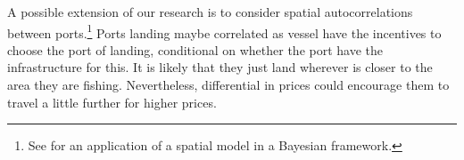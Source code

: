 A possible extension of our research is to consider spatial
autocorrelations between ports.\footnote{See \cite{morris2019bayesian}
  for an application of a spatial model in a Bayesian framework.} Ports
landing maybe correlated as vessel have the incentives to choose the
port of landing, conditional on whether the port have the infrastructure
for this. It is likely that they just land wherever is closer to the
area they are fishing. Nevertheless, differential in prices could
encourage them to travel a little further for higher prices.



\address{%
Author One\\
Affiliation\\%
line 1\\ line 2\\
%
\url{https://journal.r-project.org}\\%
\textit{ORCiD: \href{https://orcid.org/0000-0002-9079-593X}{0000-0002-9079-593X}}\\%
\href{mailto:author1@work}{\nolinkurl{author1@work}}%
}

\address{%
Author Two\\
Affiliation 1\\%
line 1 affiliation 1\\ line 2 affiliation 1\\
Affiliation 2\\%
line 1 affiliation 2\\ line 2 affiliation 2\\
%
\url{https://journal.r-project.org}\\%
\textit{ORCiD: \href{https://orcid.org/0000-0002-9079-593X}{0000-0002-9079-593X}}\\%
\href{mailto:author2@work}{\nolinkurl{author2@work}}%
}

\address{%
Author Three\\
Affiliation\\%
line 1 affiliation\\ line 2 affiliation\\
%
\url{https://journal.r-project.org}\\%
%
\href{mailto:author3@work}{\nolinkurl{author3@work}}%
}
